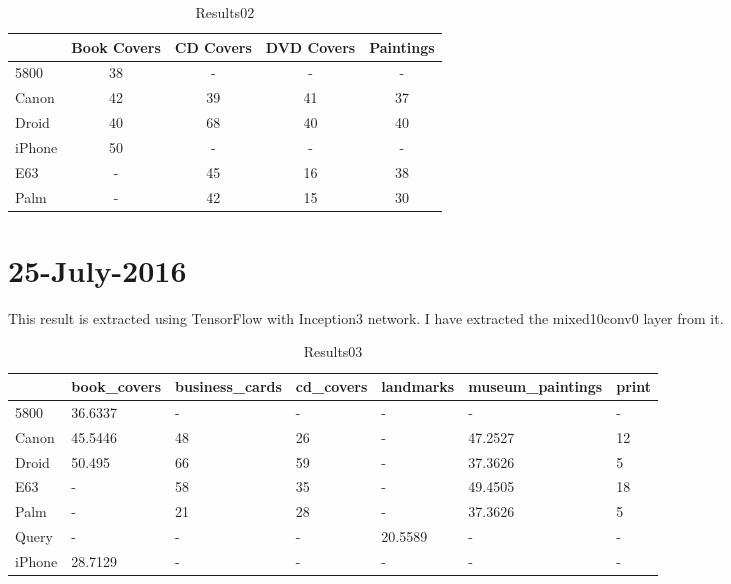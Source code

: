 \begin{table*}
{\setlength{\tabcolsep}{14pt}
\caption{Results02}
\begin{center}
  \begin{tabular}{ |l | c | c | c | c | }
    \hline
    		   &Book Covers & CD Covers & DVD Covers & Paintings \\ \hline 
    5800   & 38         & -         & -          & -         \\ \hline 
    Canon  & 42         & 39        & 41         & 37        \\ \hline 
    Droid  & 40         & 68        & 40         & 40        \\ \hline 
    iPhone & 50         & -         & -          & -         \\ \hline 
    E63    & -          & 45	       & 16         & 38        \\ \hline 
    Palm   & -          & 42        & 15         & 30        \\ \hline

  \end{tabular}
\end{center}
\label{results02}}
\end{table*}

\section{25-July-2016}
This result is extracted using TensorFlow with Inception3 network. I have extracted the mixed10conv0 layer from it.

\begin{table*}
{\setlength{\tabcolsep}{14pt}
\caption{Results03}
\begin{center}
\begin{tabular}{|l|l|l|l|l|l|l|}

 & book\_covers & business\_cards & cd\_covers & landmarks & museum\_paintings & print \\ \hline
5800   &     36.6337 &              - &         - &         - &                - &     - \\ \hline
Canon  &     45.5446 &             48 &        26 &         - &          47.2527 &    12 \\ \hline
Droid  &      50.495 &             66 &        59 &         - &          37.3626 &     5 \\ \hline
E63    &           - &             58 &        35 &         - &          49.4505 &    18 \\ \hline
Palm   &           - &             21 &        28 &         - &          37.3626 &     5 \\ \hline
Query  &           - &              - &         - &   20.5589 &                - &     - \\ \hline
iPhone &     28.7129 &              - &         - &         - &                - &     - \\ \hline

\end{tabular}
\end{center}
\label{results03}}
\end{table*}

